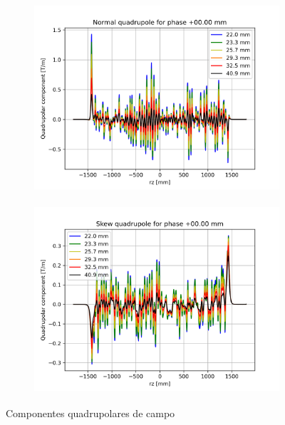 \documentclass[a4paper,12pt]{article}
\begin{document}
\begin{figure}[H]
\begin{subfigure}{0.5\textwidth}
\includegraphics[width=0.9\linewidth, height=7cm]{figs/phase0 Normal quadrupole.png} 
\label{fig:subim10q}
\end{subfigure}
\begin{subfigure}{0.5\textwidth}
\includegraphics[width=0.9\linewidth, height=7cm]{figs/phase0 Skew quadrupole.png}
\label{fig:subim20q}
\end{subfigure}
\caption{Componentes quadrupolares de campo}
\label{fig:quad0}
\end{figure}
\end{document}
